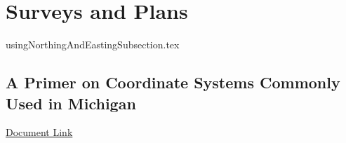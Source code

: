 \documentclass[class=report , crop=false, openany, titlepage, twoside, multi={itemize, figure, verbatim}, float=false]{standalone}
\title{}  %
\begin{document}
\ifstandalone
\maketitle %
\clearpage
\tableofcontents %
\fi

\section{Surveys and Plans}

{usingNorthingAndEastingSubsection.tex}
\subsection[Coordinate Systems for Michigan]{A Primer on Coordinate Systems Commonly Used in Michigan}


\href{../../../../documentation/references/geo101/MiCoordinateSystems.pdf}{Document Link}

\end{document}
